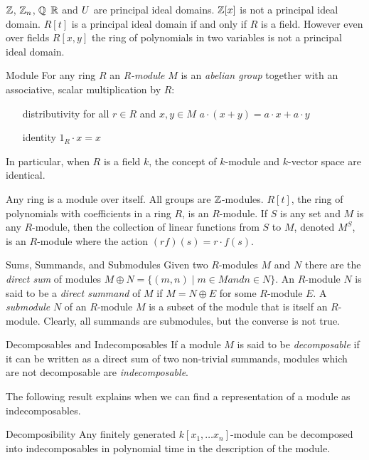 \begin{example}
$\mathbb{Z}$, $\mathbb{Z}_n$, $\mathbb{Q}$ $\mathbb{R}$ and $U$ are principal ideal domains. $\mathbb{Z}[x]$ is not a principal ideal domain. $R[t]$ is a principal ideal domain if and only if $R$ is a field. However
even over fields $R[x,y]$ the ring of polynomials in two variables is not a principal ideal domain.
\end{example}
\begin{definition}{Module}
For any ring $R$ an \emph{R-module} $M$ is an \emph{abelian group} together with an associative, scalar multiplication by $R$: 
\begin{itemize}
\item[distributivity] for all $r \in R$ and $x,y \in M$ $a \cdot (x + y)  = a \cdot x + a \cdot y$
\item[identity] $1_R \cdot x = x$
\end{itemize}
\end{definition}
In particular, when $R$ is a field $k$, the concept of $k$-module and $k$-vector space are identical.
\begin{example}
Any ring is a module over itself.  All groups are $\mathbb{Z}$-modules. $R[t]$, the ring of polynomials with coefficients in a ring $R$, is an $R$-module. If $S$ is any set and $M$ is any $R$-module, then the collection of linear functions from $S$ to $M$, denoted $M^S$, is an $R$-module where the action $(rf)(s) =  r \cdot f(s)$.
\end{example}
\begin{definition}{Sums, Summands, and Submodules}
Given two $R$-modules $M$ and $N$ there are the \emph{direct sum} of modules $M \oplus N = \{ (m,n) \mid m \in M and n \in N \}$.
An $R$-module $N$ is said to be a \emph{direct summand} of $M$ if $M = N \oplus E$ for some $R$-module $E$. 
A \emph{submodule} $N$ of an $R$-module $M$ is a subset of the module that is itself an $R$-module. Clearly, all summands are submodules, but the converse is not true.
\end{definition}
\begin{definition}{Decomposables and Indecomposables}
If a module $M$ is said to be \emph{decomposable} if it can be written as a direct sum of two non-trivial summands, modules which are not decomposable are \emph{indecomposable}. 
\end{definition}
The following result explains when we can find a representation of a module as indecomposables.
\begin{theorem}{Decomposibility}
Any finitely generated $k[x_1, \ldots x_n]$-module can be decomposed into indecomposables in polynomial time in the description of the module. 
\end{theorem}
